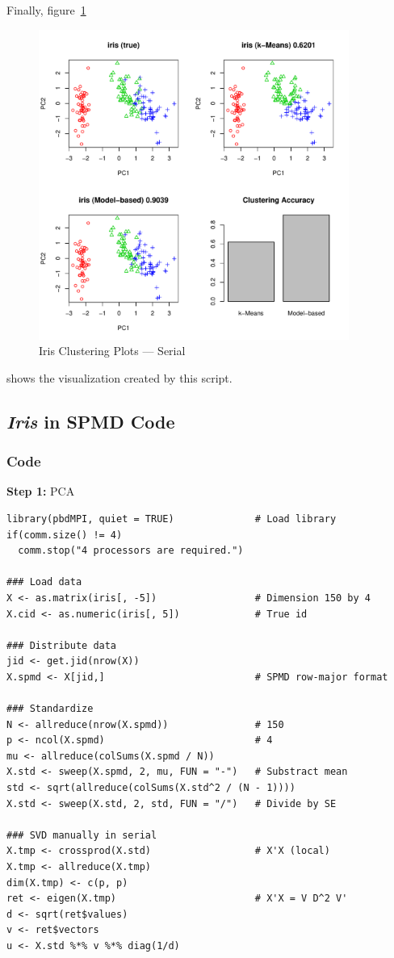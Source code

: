 Finally, figure~\ref{fig:iris_cluster_serial}
\begin{figure}[h!bt]
  \centering
  \includegraphics[width=4in]{pbdDEMO-include/pics/serial_plot.pdf}
  \caption{Iris Clustering Plots --- Serial}
  \label{fig:iris_cluster_serial}
\end{figure}
shows the visualization created by this script.








\subsection{{\it Iris} in SPMD Code}

\subsubsection{Code}



\textbf{Step 1:}  PCA\vspace{-.6cm}
\begin{lstlisting}[language=rr]
library(pbdMPI, quiet = TRUE)              # Load library
if(comm.size() != 4)
  comm.stop("4 processors are required.")

### Load data
X <- as.matrix(iris[, -5])                 # Dimension 150 by 4
X.cid <- as.numeric(iris[, 5])             # True id

### Distribute data
jid <- get.jid(nrow(X))
X.spmd <- X[jid,]                          # SPMD row-major format

### Standardize
N <- allreduce(nrow(X.spmd))               # 150
p <- ncol(X.spmd)                          # 4
mu <- allreduce(colSums(X.spmd / N))
X.std <- sweep(X.spmd, 2, mu, FUN = "-")   # Substract mean
std <- sqrt(allreduce(colSums(X.std^2 / (N - 1))))
X.std <- sweep(X.std, 2, std, FUN = "/")   # Divide by SE

### SVD manually in serial
X.tmp <- crossprod(X.std)                  # X'X (local)
X.tmp <- allreduce(X.tmp)
dim(X.tmp) <- c(p, p)
ret <- eigen(X.tmp)                        # X'X = V D^2 V'
d <- sqrt(ret$values)
v <- ret$vectors
u <- X.std %*% v %*% diag(1/d)                        
\end{lstlisting}


